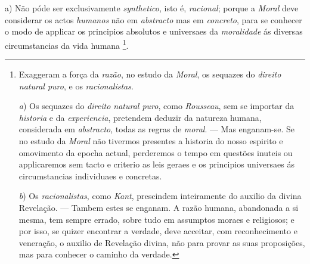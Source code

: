 a) Não póde ser exclusivamente \emph{synthetico}, isto é, \emph{racional}; porque a \emph{Moral} deve considerar os actos \emph{humanos} não em \emph{abstracto} mas em \emph{concreto}, para se conhecer o modo de applicar os principios absolutos e universaes da \emph{moralidade} ás diversas circumstancias da vida humana \footnote{Exaggeram a força da \emph{razão}, no estudo da \emph{Moral}, os sequazes do \emph{direito natural puro}, e os \emph{racionalistas}.\par \emph{a}) Os sequazes do \emph{direito natural puro}, como \emph{Rousseau}, sem se importar da \emph{historia} e da \emph{experiencia}, pretendem deduzir da natureza humana, considerada em \emph{abstracto}, todas as regras de \emph{moral}. --- Mas enganam-se. Se no estudo da \emph{Moral} não tivermos presentes a historia do nosso espirito e omovimento da epocha actual, perderemos o tempo em questões inuteis ou applicaremos sem tacto e criterio as leis geraes e os principios universaes ás circumstancias individuaes e concretas.\par \emph{b}) Os \emph{racionalistas}, como \emph{Kant}, prescindem inteiramente do auxilio da divina Revelação. --- Tambem estes se enganam. A razão humana, abandonada a si mesma, tem sempre errado, sobre tudo em assumptos moraes e religiosos; e por isso, se quizer encontrar a verdade, deve acceitar, com reconhecimento e veneração, o auxilio de Revelação divina, não para provar as suas proposições, mas para conhecer o caminho da verdade.}.

